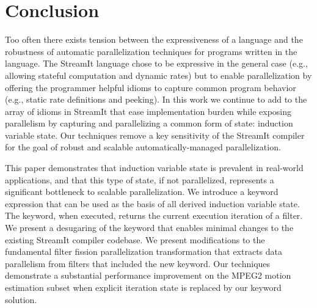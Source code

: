\vspace{-4pt}
\section{Conclusion}
\label{sec:conclusion}

Too often there exists tension between the expressiveness of a
language and the robustness of automatic parallelization techniques
for programs written in the language. The StreamIt language chose to
be expressive in the general case (e.g., allowing stateful computation
and dynamic rates) but to enable parallelization by offering the
programmer helpful idioms to capture common program behavior (e.g.,
static rate definitions and peeking). In this work we continue to add
to the array of idioms in StreamIt that ease implementation burden
while exposing parallelism by capturing and parallelizing a common
form of state: induction variable state.  Our techniques remove a key
sensitivity of the StreamIt compiler for the goal of robust and
scalable automatically-managed parallelization.

This paper demonstrates that induction variable state is prevalent in
real-world applications, and that this type of state, if not
parallelized, represents a significant bottleneck to scalable
parallelization. We introduce a keyword expression that can be used as
the basis of all derived induction variable state. The keyword, when
executed, returns the current execution iteration of a filter. We
present a desugaring of the keyword that enables minimal changes to
the existing StreamIt compiler codebase. We present modifications to
the fundamental filter fission parallelization transformation that
extracts data parallelism from filters that included the new keyword.
Our techniques demonstrate a substantial performance improvement on
the MPEG2 motion estimation subset when explicit iteration state is
replaced by our keyword solution.


%

